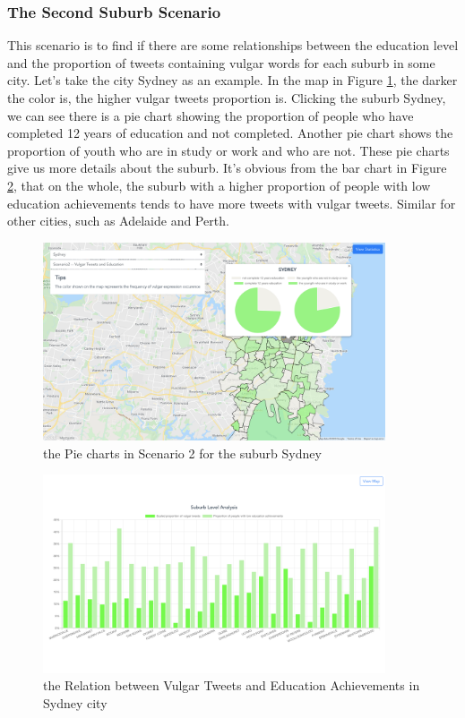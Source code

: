 \documentclass{article}
\begin{document}
\subsubsection{The Second Suburb Scenario} 

This scenario is to find if there are some relationships between the education level and the proportion of tweets containing vulgar words for each suburb in some city. Let’s take the city Sydney as an example. In the map in Figure
\ref{fig:Sydney_pie_chart}, the darker the color is, the higher vulgar tweets proportion is. Clicking the suburb Sydney, we can see there is a pie chart showing the proportion of people who have completed 12 years of education and not completed. Another pie chart shows the proportion of youth who are in study or work and who are not. These pie charts give us more details about the suburb. It’s obvious from the bar chart in Figure
\ref{fig:Sydney_histogram}, that on the whole, the suburb with a higher proportion of people with low education achievements tends to have more tweets with vulgar tweets. Similar for other cities, such as Adelaide and Perth.

\begin{figure}[htp]
\centering
\includegraphics[width=0.9\textwidth]{img/Sydney_pie_chart.jpg}
\caption{the Pie charts in Scenario 2 for the suburb Sydney}
\label{fig:Sydney_pie_chart}
\end{figure}

\begin{figure}[htp]
\centering
\includegraphics[width=0.9\textwidth]{img/Sydney_histogram.jpg}
\caption{the Relation between Vulgar Tweets and Education Achievements in Sydney city}
\label{fig:Sydney_histogram}
\end{figure}
\end{document}
